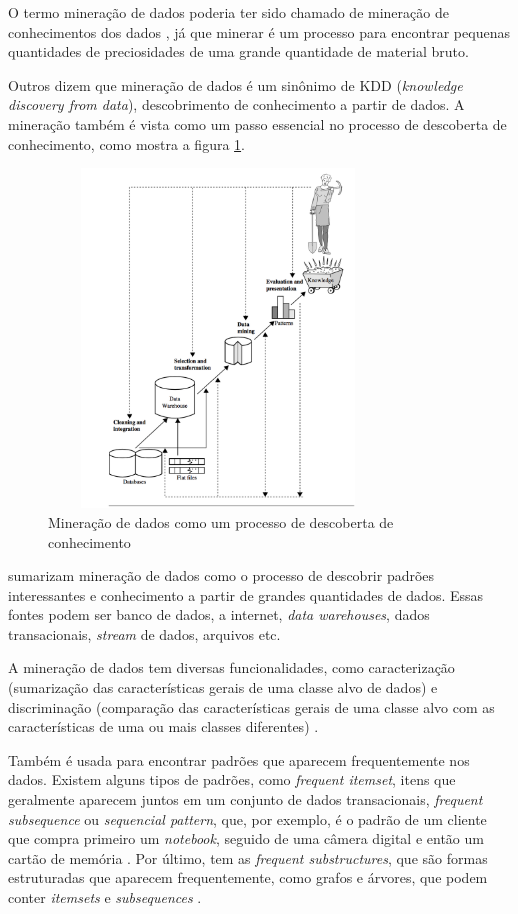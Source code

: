 O termo mineração de dados poderia ter sido chamado de mineração de conhecimentos dos dados \citep{jmj}, já que minerar é um processo para encontrar pequenas quantidades de preciosidades de uma grande quantidade de material bruto. 

Outros dizem que mineração de dados é um sinônimo de KDD (\textit{knowledge discovery from data}), descobrimento de conhecimento a partir de dados. A mineração também é vista como um passo essencial no processo de descoberta de conhecimento, como mostra a figura \ref{kdd}. 

\begin{figure}[H]
\centering
\includegraphics[height=9cm, width=9cm]{imagens/kdd.png}
\caption{Mineração de dados como um processo de descoberta de conhecimento \citep{jmj}}
\label{kdd}
\end{figure}

\citeauthor{jmj} sumarizam mineração de dados como o processo de descobrir padrões interessantes e conhecimento a partir de grandes quantidades de dados. Essas fontes podem ser banco de dados, a internet, \textit{data warehouses}, dados transacionais, \textit{stream} de dados, arquivos etc. 

A mineração de dados tem diversas funcionalidades, como caracterização (sumarização das características gerais de uma classe alvo de dados) e discriminação (comparação das características gerais de uma classe alvo com as características de uma ou mais classes diferentes) \citep{jmj}. 

Também é usada para encontrar padrões que aparecem frequentemente nos dados. Existem alguns tipos de padrões, como \textit{frequent itemset}, itens que geralmente aparecem juntos em um conjunto de dados transacionais, \textit{frequent subsequence} ou \textit{sequencial pattern}, que, por exemplo, é o padrão de um cliente que compra primeiro um \textit{notebook}, seguido de uma câmera digital e então um cartão de memória \citep{jmj}. Por último, tem as \textit{frequent substructures}, que são formas estruturadas que aparecem frequentemente, como grafos e árvores, que podem conter \textit{itemsets} e \textit{subsequences}  \citep{jmj}.

